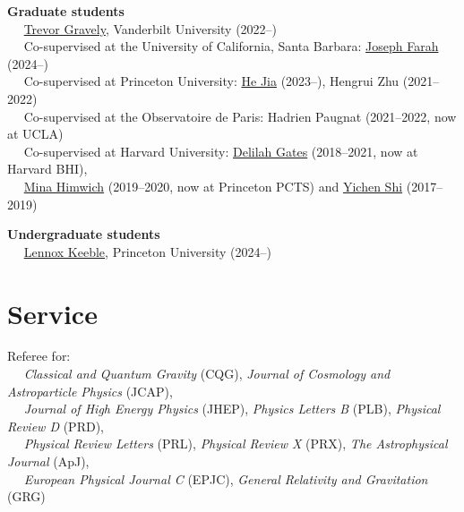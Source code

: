 \documentclass[margin,line]{resume}
\begin{document}
\begin{resume}
\textbf{Graduate students} \\
	\mbox{ }\mbox{ } \href{https://github.com/graveltr}{Trevor Gravely}, Vanderbilt University (2022--)
	\vspace{2mm} \\
	\mbox{ }\mbox{ } Co-supervised at the University of California, Santa Barbara: \href{https://josephfarah.co/}{Joseph Farah} (2024--)
	\vspace{2mm} \\
	\mbox{ }\mbox{ } Co-supervised at Princeton University: \href{https://www.hejia.io/}{He Jia} (2023--), Hengrui Zhu (2021--2022)
	\vspace{2mm} \\
	\mbox{ }\mbox{ } Co-supervised at the Observatoire de Paris: Hadrien Paugnat (2021--2022, now at UCLA)
	\vspace{2mm} \\
	\mbox{ }\mbox{ } Co-supervised at Harvard University: \href{https://bhi.fas.harvard.edu/people/delilah-gates/}{Delilah Gates} (2018--2021, now at Harvard BHI), \\
	\mbox{ }\mbox{ } \href{https://pcts.princeton.edu/people/mina-himwich-0}{Mina Himwich} (2019--2020, now at Princeton PCTS) and \href{https://bhi.fas.harvard.edu/people/yichen-shi/}{Yichen Shi} (2017--2019)

\textbf{Undergraduate students} \\
	\mbox{ }\mbox{ } \href{https://lennoxkeeble.github.io/}{Lennox Keeble}, Princeton University (2024--)

\section{\mysidestyle Service}

Referee for: \\
	\mbox{ }\mbox{ } \textit{Classical and Quantum Gravity} (CQG), \textit{Journal of Cosmology and Astroparticle Physics} (JCAP), \\
	\mbox{ }\mbox{ } \textit{Journal of High Energy Physics} (JHEP), \textit{Physics Letters B} (PLB),  \textit{Physical Review D} (PRD), \\
	\mbox{ }\mbox{ } \textit{Physical Review Letters} (PRL), \textit{Physical Review X} (PRX), \textit{The Astrophysical Journal} (ApJ), \\
	\mbox{ }\mbox{ } \textit{European Physical Journal C} (EPJC), \textit{General Relativity and Gravitation} (GRG)
	\vspace{-1mm}


\end{resume}
\end{document}
